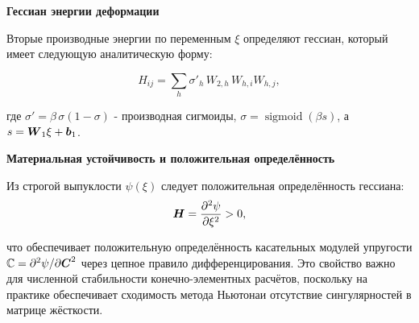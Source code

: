 \textbf{Гессиан энергии деформации}

Вторые производные энергии по переменным \(\xi\) определяют гессиан, который имеет следующую аналитическую форму:

\begin{equation}
 H_{ij} = \sum_h \sigma'_h\,W_{2,h}\,W_{h,i}W_{h,j},
\label{eq:energy_hessian}
\end{equation}

где $\sigma' = \beta\,\sigma(1-\sigma)$ - производная сигмоиды, 
$\sigma=\operatorname{sigmoid}(\beta s)$, а $s=\boldsymbol{W}_1\xi+\boldsymbol{b}_1$.

\textbf{Материальная устойчивость и положительная определённость}


Из строгой выпуклости \(\psi(\xi)\) следует положительная определённость гессиана:
\begin{equation}
 \boldsymbol{H} = \frac{\partial^2\psi}{\partial\xi^2} > 0,
\label{eq:positive_hessian}
\end{equation}

что обеспечивает положительную определённость касательных модулей упругости 
$\mathbb{C} = \partial^2\psi/\partial\boldsymbol{C}^2$ через цепное правило дифференцирования. 
Это свойство важно для численной стабильности конечно-элементных расчётов, 
поскольку на практике обеспечивает сходимость метода Ньютонаи отсутствие сингулярностей в матрице жёсткости.




